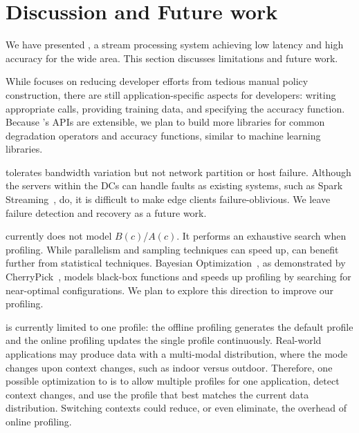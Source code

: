 \section{Discussion and Future work}
\label{sec:discussion}

We have presented \sysname{}, a stream processing system achieving low latency
and high accuracy for the wide area. This section discusses limitations and
future work.

 While \sysname{} focuses on reducing
developer efforts from tedious manual policy construction, there are still
application-specific aspects for developers: writing appropriate \maybe{} calls,
providing training data, and specifying the accuracy function. Because
\sysname{}'s APIs are extensible, we plan to build more libraries for common
degradation operators and accuracy functions, similar to machine learning
libraries.

 \sysname{} tolerates bandwidth
variation but not network partition or host failure. Although the servers within
the DCs can handle faults as existing systems, such as Spark
Streaming~\cite{zaharia2013discretized}, do,  it is difficult to make edge
clients failure-oblivious.  We leave failure detection and recovery as a future
work.

 \sysname{} currently does not model $B(c)$/$A(c)$. It
performs an exhaustive search when profiling. While parallelism and sampling
techniques can speed up, \sysname{} can benefit further from statistical
techniques. Bayesian Optimization~\cite{snoek2012practical}, as demonstrated by
CherryPick~\cite{alipourfard2017cherrypick}, models black-box functions and
speeds up profiling by searching for near-optimal configurations. We plan to
explore this direction to improve our profiling.


 \sysname{} is currently limited to one profile: the
offline profiling generates the default profile and the online profiling updates
the single profile continuously.  Real-world applications may produce data with
a multi-modal distribution, where the mode  changes upon context changes,
such as
indoor versus outdoor. Therefore, one possible optimization to \sysname{} is to
allow multiple profiles for one application, detect context changes, and use the
profile that best matches the current data distribution.  Switching contexts
could reduce, or even eliminate, the overhead of online profiling.

